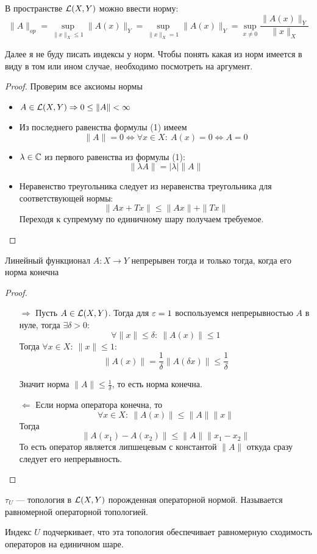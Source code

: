 \begin{claim}
	В пространстве $\mathcal{L}(X,Y)$ можно ввести норму:
	\begin{equation}
		\|A\|_{op} = \sup\limits_{\|x\|_X \leq 1} \|A(x)\|_Y = \sup\limits_{\|x\|_X = 1} \|A(x)\|_Y = \sup\limits_{x \neq 0}\frac{\|A(x)\|_Y}{\|x\|_X}
	\end{equation}
\end{claim}
\begin{remark}
	Далее я не буду писать индексы у норм. Чтобы понять какая из норм имеется в виду в том или ином случае, необходимо посмотреть на аргумент. 
\end{remark}
\begin{proof}
	Проверим все аксиомы нормы
	\begin{itemize}
		\item$A \in \mathcal{L}(X,Y) \Rightarrow 0 \leq \|A\| < \infty$
		\item Из последнего равенства формулы (1) имеем
		$$
		\|A\| = 0 \Leftrightarrow \forall x \in X: \ A(x) = 0 \Leftrightarrow A = 0
		$$
		\item $ \lambda \in \mathbb{C}$ из первого равенства из формулы (1):
		$$
		\|\lambda A\| = |\lambda| \|A\|
		$$
		\item Неравенство треугольника следует из неравенства треугольника для соответствующей нормы:
		$$
		\|Ax + Tx\| \leq \|Ax\| + \|Tx\|
		$$
		Переходя к супремуму по единичному шару получаем требуемое.
	\end{itemize}
\end{proof}
{ \footnotesize \color{violet}
\begin{claim} \label{cl:linfuncon}
	Линейный функционал $A : X \to Y$ непрерывен тогда и только тогда, когда его норма конечна
\end{claim}
\begin{proof}
	\begin{enumerate}
		\item[$\Rightarrow$] Пусть $A \in \mathcal{L}(X, Y)$. Тогда для $\varepsilon =1$ воспользуемся непрерывностью $A$ в нуле, тогда $\exists \delta > 0$: 
		$$
		\forall \|x\| \leq \delta: \ \|A(x)\| \leq 1 
		$$
		Тогда $\forall x \in X: \  \|x\| \leq 1$:
		$$
		\|A(x)\| = \frac{1}{\delta}\|A(\delta x)\| \leq  \frac{1}{\delta}
		$$
		
		Значит норма $\|A\| \leq \frac{1}{\delta}$, то есть норма конечна.
		\item[$\Leftarrow$] Если норма оператора конечна, то 
		$$
		\forall x \in X: \ \|A(x)\| \leq \|A\| \|x\|
		$$
		Тогда 
		$$
		\|A(x_1) - A(x_2)\| \leq \|A\| \|x_1 - x_2\|
		$$
		То есть оператор является липшецевым с константой $\|A\|$ откуда сразу следует его непрерывность.
	\end{enumerate}
\end{proof}
}
\begin{definition}
	$\tau_U$ --- топология в $\mathcal{L}(X,Y)$ порожденная операторной нормой. Называется равномерной операторной топологией.
\end{definition}
\begin{remark}
	Индекс $U$ подчеркивает, что эта топология обеспечивает равномерную сходимость операторов на единичном шаре.
\end{remark}


